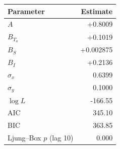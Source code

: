 \begin{tabular}{l r}
\toprule
Parameter & Estimate \\
\midrule
$A$ & +0.8009 \\
$B_{T_a}$ & +0.1019 \\
$B_{S}$ & +0.002875 \\
$B_{I}$ & +0.2136 \\
$\sigma_x$ & 0.6399 \\
$\sigma_y$ & 0.1000 \\
\midrule
$\log L$ & -166.55 \\
AIC & 345.10 \\
BIC & 363.85 \\
Ljung--Box $p$ (lag 10) & 0.000 \\
\bottomrule
\end{tabular}